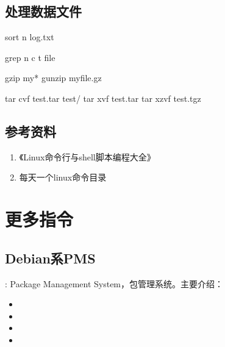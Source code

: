 \documentclass[letterpaper,10pt,english]{sphinxmanual}
\begin{document}
\subsection{处理数据文件}
\label{\detokenize{linux/01_basic:id4}}
%
\begin{sphinxVerbatim}[commandchars=\\\{\}]
sort \PYG{o}{[}\PYGZhy{}n\PYG{o}{]} log.txt 

grep \PYG{o}{[}\PYGZhy{}n\PYG{o}{]} \PYG{o}{[}\PYGZhy{}c\PYG{o}{]} t file 

gzip my*
gunzip myfile.gz

tar \PYGZhy{}cvf test.tar test/
tar \PYGZhy{}xvf test.tar
tar \PYGZhy{}xzvf test.tgz
\end{sphinxVerbatim}


\subsection{参考资料}
\label{\detokenize{linux/01_basic:id5}}\begin{enumerate}
\item {} 
《Linux命令行与shell脚本编程大全》

\item {} 
每天一个linux命令目录

\end{enumerate}
\begin{quote}

\end{quote}


\section{更多指令}
\label{\detokenize{linux/02_more::doc}}\label{\detokenize{linux/02_more:id1}}

\subsection{Debian系PMS}
\label{\detokenize{linux/02_more:debianpms}}
 : Package Management System，包管理系统。主要介绍：
\begin{itemize}
\item {} 

\item {} 

\item {} 

\item {} 

\end{itemize}
\end{document}

